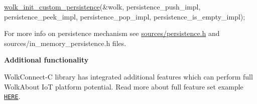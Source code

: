 \begin{DoxyCode}
\hyperlink{wolk__connector_8h_a4cb5cc0164b0ab19f9b2bf36d28e9913}{wolk\_init\_custom\_persistence}(&wolk,
                             persistence\_push\_impl,
                             persistence\_peek\_impl, persistence\_pop\_impl,
                             persistence\_is\_empty\_impl);
\end{DoxyCode}


For more info on persistence mechanism see {\ttfamily \hyperlink{persistence_8h}{sources/persistence.\+h}} and {\ttfamily sources/in\+\_\+memory\+\_\+persistence.\+h} files.

{\bfseries Additional functionality}

Wolk\+Connect-\/C library has integrated additional features which can perform full Wolk\+About IoT platform potential. Read more about full feature set example \href{https://github.com/Wolkabout/WolkConnect-C/tree/master/examples/full_feature_set}{\tt H\+E\+RE}. 